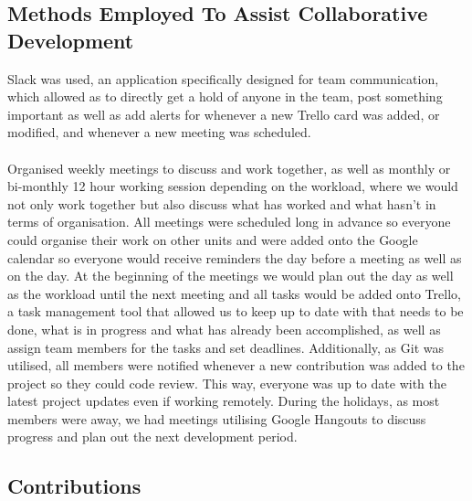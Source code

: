 \documentclass[11pt,a4paper]{article}
\begin{document}
        \subsection{Methods Employed To Assist Collaborative Development}
        Slack was used, an application specifically designed for team communication, which allowed as to directly get a hold of anyone in the team, post something important as well as add alerts for whenever a new Trello card was added, or modified, and whenever a new meeting was scheduled. \\ \\
        Organised weekly meetings to discuss and work together, as well as monthly or bi-monthly 12 hour working session depending on the workload, where we would not only work together but also discuss what has worked and what hasn’t in terms of organisation. All meetings were scheduled long in advance so everyone could organise their work on other units and were added onto the Google calendar so everyone would receive reminders the day before a meeting as well as on the day.
        At the beginning of the meetings we would plan out the day as well as the workload until the next meeting and all tasks would be added onto Trello, a task management tool that allowed us to keep up to date with that needs to be done, what is in progress and what has already been accomplished, as well as assign team members for the tasks and set deadlines.
        Additionally, as Git was utilised, all members were notified whenever a new contribution was added to the project so they could code review. This way, everyone was up to date with the latest project updates even if working remotely. 
        During the holidays, as most members were away, we had meetings utilising Google Hangouts to discuss progress and plan out the next development period. 

        \pagebreak

        \subsection{Contributions}
\end{document}
